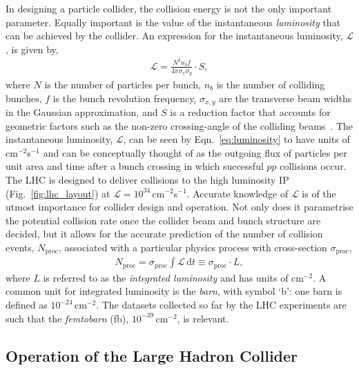In designing a particle collider, the collision energy is not the only important parameter.
Equally important is the value of the instantaneous \textit{luminosity}
that can be achieved by the collider.
An expression for the instantaneous luminosity, $\mathcal{L}$, is given by,
\begin{align}
    \mathcal{L} = \frac{N^2 n_b f}{4 \pi \sigma_x \sigma_y} \cdot S,
    \label{eq:luminosity}
\end{align}
where $N$ is the number of particles per bunch, $n_b$ is the number of colliding bunches,
$f$ is the bunch revolution frequency, $\sigma_{x,y}$ are the transverse beam widths in the
Gaussian approximation, and $S$ is a reduction factor that accounts for geometric factors
such as the non-zero crossing-angle of the colliding beams~\cite{LHCDesignIII,LumiConcept}.
The instantaneous luminosity, $\mathcal{L}$, can be seen by Eqn.~\ref{eq:luminosity}
to have units of cm$^{-2}$s$^{-1}$ and can be conceptually thought of as the
outgoing flux of particles per unit area and time after a bunch crossing in which successful $pp$
collisions occur.
The LHC is designed to deliver collisions to the high luminosity IP (Fig.~\ref{fig:lhc_layout})
at $\mathcal{L} = 10^{34}$\,cm$^{-2}$s$^{-1}$.
Accurate knowledge of $\mathcal{L}$ is of the utmost importance for collider design and operation.
Not only does it parametrise the potential collision rate once the collider beam and bunch
structure are decided, but it allows for the accurate prediction of the number
of collision events, $N_{\text{proc}}$, associated with a particular physics process
with cross-section $\sigma_{\text{proc}}$,
\begin{align}
    N_{\text{proc}} = \sigma_{\text{proc}} \int \mathcal{L}\, \mathrm{d}t \equiv \sigma_{\text{proc}} \cdot L,
    \label{eq:n_exp_lumi}
\end{align}
where $L$ is referred to as the \textit{integrated luminosity} and has units of cm$^{-2}$.
A common unit for integrated luminosity is the \textit{barn}, with symbol `b': one barn is defined as $10^{-24}$\,cm$^{-2}$.
The datasets collected so far by the LHC experiments are such that the \textit{femtobarn} (fb), $10^{-39}$\,cm$^{-2}$, is relevant.

\subsection{Operation of the Large Hadron Collider}
\label{sec:lhc_operation}

